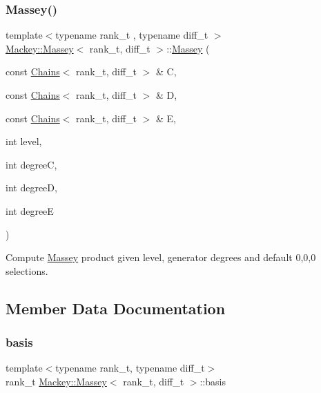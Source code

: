 \subsubsection{\texorpdfstring{Massey()}{Massey()}\hspace{0.1cm}{\footnotesize\ttfamily [3/3]}}
{\footnotesize\ttfamily template$<$typename rank\+\_\+t , typename diff\+\_\+t $>$ \\
\hyperlink{classMackey_1_1Massey}{Mackey\+::\+Massey}$<$ rank\+\_\+t, diff\+\_\+t $>$\+::\hyperlink{classMackey_1_1Massey}{Massey} (\begin{DoxyParamCaption}\item[{const \hyperlink{classMackey_1_1Chains}{Chains}$<$ rank\+\_\+t, diff\+\_\+t $>$ \&}]{C,  }\item[{const \hyperlink{classMackey_1_1Chains}{Chains}$<$ rank\+\_\+t, diff\+\_\+t $>$ \&}]{D,  }\item[{const \hyperlink{classMackey_1_1Chains}{Chains}$<$ rank\+\_\+t, diff\+\_\+t $>$ \&}]{E,  }\item[{int}]{level,  }\item[{int}]{degreeC,  }\item[{int}]{degreeD,  }\item[{int}]{degreeE }\end{DoxyParamCaption})}



Compute \hyperlink{classMackey_1_1Massey}{Massey} product given level, generator degrees and default 0,0,0 selections. 



\subsection{Member Data Documentation}
\mbox{\label{classMackey_1_1Massey_ab738306412d735a31df4913c20948d65}} 
\subsubsection{\texorpdfstring{basis}{basis}}
{\footnotesize\ttfamily template$<$typename rank\+\_\+t, typename diff\+\_\+t$>$ \\
rank\+\_\+t \hyperlink{classMackey_1_1Massey}{Mackey\+::\+Massey}$<$ rank\+\_\+t, diff\+\_\+t $>$\+::basis}



